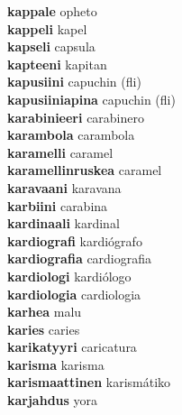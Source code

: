 \textbf{kappale } opheto \\
\textbf{kappeli } kapel \\
\textbf{kapseli } capsula \\
\textbf{kapteeni } kapitan \\
\textbf{kapusiini } capuchin (fli) \\
\textbf{kapusiiniapina } capuchin (fli) \\
\textbf{karabinieeri } carabinero \\
\textbf{karambola } carambola \\
\textbf{karamelli } caramel \\
\textbf{karamellinruskea } caramel \\
\textbf{karavaani } karavana \\
\textbf{karbiini } carabina \\
\textbf{kardinaali } kardinal \\
\textbf{kardiografi } kardiógrafo \\
\textbf{kardiografia } cardiografia \\
\textbf{kardiologi } kardiólogo \\
\textbf{kardiologia } cardiologia \\
\textbf{karhea } malu \\
\textbf{karies } caries \\
\textbf{karikatyyri } caricatura \\
\textbf{karisma } karisma \\
\textbf{karismaattinen } karismátiko \\
\textbf{karjahdus } yora \\

